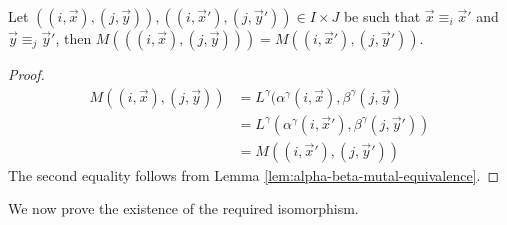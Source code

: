 \documentclass[../paper.tex]{subfiles}
\begin{document}
\begin{lem}
  Let $((i, \vec{x}), (j, \vec{y})), ((i, \vec{x}'), (j, \vec{y}')) \in I \times
  J$ be such that $\vec{x} \equiv_i \vec{x}'$ and $\vec{y} \equiv_j \vec{y}'$,
  then $M(((i, \vec{x}), (j, \vec{y}))) = M((i, \vec{x}'), (j, \vec{y}'))$.
  \label{lem:matrix-quot-well-defined}
\end{lem}
\begin{proof}
  \begin{align*}
    M((i, \vec{x}),(j, \vec{y})) &= L^{\gamma}(\alpha^{\gamma}(i, \vec{x}), \beta^{\gamma}(j, \vec{y}) \\
                                 &= L^{\gamma}(\alpha^{\gamma}(i, \vec{x}'), \beta^{\gamma}(j, \vec{y}'))\\
                                 &= M((i, \vec{x}'), (j, \vec{y}'))
  \end{align*}
  The second equality follows from Lemma \ref{lem:alpha-beta-mutal-equivalence}.
\end{proof}

We now prove the existence of the required isomorphism.
\end{document}
